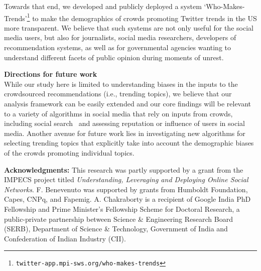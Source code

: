 \documentclass[letterpaper]{article}
\begin{document}
Towards that end, we developed and publicly deployed a system
`Who-Makes-Trends'\footnote{\tt twitter-app.mpi-sws.org/who-makes-trends} 
to make the demographics
of crowds promoting Twitter trends in the US more transparent.
We believe that such systems are not only useful for the social media
users, but also for journalists, social media researchers, developers
of recommendation systems, as well as for governmental agencies
wanting to understand different facets of public opinion during
moments of unrest.

\vspace{1mm}
\noindent \textbf{Directions for future work} \\ 
While our study here is limited to understanding biases in the inputs to the crowdsourced
recommendations (i.e., trending topics), we believe that our analysis
framework can be easily extended and our core findings will be
relevant to a variety of algorithms in social media that rely on
inputs from crowds, including social search~\cite{Kulshrestha2017} and
assessing reputation or influence of users in social media. Another
avenue for future work lies in investigating new algorithms for
selecting trending topics that explicitly take into account the
demographic biases of the crowds promoting individual topics.

\vspace{0.5cm}
\noindent\textbf{Acknowledgments:}
This research was partly supported by a grant from the IMPECS project
titled {\it Understanding, Leveraging and Deploying Online Social Networks}.
F. Benevenuto was supported by grants from Humboldt Foundation, Capes, CNPq, and Fapemig.
A. Chakraborty is a recipient of Google India PhD Fellowship and
Prime Minister's Fellowship Scheme for Doctoral Research,
a public-private partnership between Science \& Engineering Research Board (SERB),
Department of Science \& Technology, Government of India and
Confederation of Indian Industry (CII).

{\small


}
\end{document}
